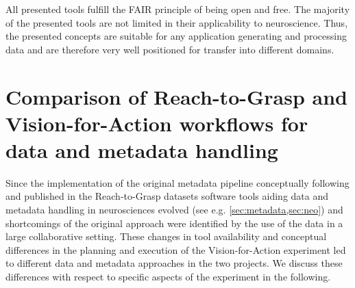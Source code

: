  All presented tools fulfill the FAIR principle of being open and free. The majority of the presented tools are not limited in their applicability to neuroscience. Thus, the presented concepts are suitable for any application generating and processing data and are therefore very well positioned for transfer into different domains.


\section{Comparison of Reach-to-Grasp and Vision-for-Action workflows for data and metadata handling}
Since the implementation of the original metadata pipeline conceptually following \citet{Zehl_2016} and published in the Reach-to-Grasp datasets \citep{Brochier_2018} software tools aiding data and metadata handling in neurosciences evolved (see e.g. \cref{sec:metadata,sec:neo}) and shortcomings of the original approach were identified by the use of the data in a large collaborative setting. These changes in tool availability and conceptual differences in the planning and execution of the Vision-for-Action experiment led to different data and metadata approaches in the two projects. We discuss these differences with respect to specific aspects of the experiment in the following.

